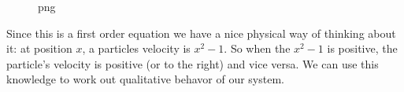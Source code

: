 \begin{Shaded}
\begin{Highlighting}[]
\OperatorTok{=}\OperatorTok{{-}}\NormalTok{,}\NormalTok{,}\NormalTok{)}
\OperatorTok{=}\OperatorTok{**} \OperatorTok{{-}} 
\DecValTok{\^{}}\DecValTok{$}\NormalTok{)}
\OperatorTok{=}\OperatorTok{=}\NormalTok{)}
\OperatorTok{=}\OperatorTok{=}\NormalTok{)}
\end{Highlighting}
\end{Shaded}

\begin{figure}
\centering
{}
\caption{png}
\end{figure}

Since this is a first order equation we have a nice physical way of
thinking about it: at position \(x\), a particles velocity is
\(x^2 -1\). So when the \(x^2-1\) is positive, the particle's velocity
is positive (or to the right) and vice versa. We can use this knowledge
to work out qualitative behavor of our system.

